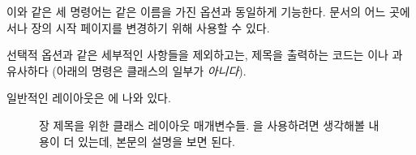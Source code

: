 이와 같은 세 명령어는 같은 이름을 가진 옵션과 동일하게 기능한다.
문서의 어느 곳에서나 장의 시작 페이지를 변경하기 위해 사용할 수 있다.

선택적 옵션과 같은 세부적인 사항들을 제외하고는,
\cmd{\chapter} 제목을 출력하는 코드는 \cmd{\book} 이나 \cmd{\part} 과 유사하다
(아래의  명령은 클래스의 일부가 \emph{아니다}).
\begin{lcode}
\newcommand{\chapterhead}[1]{ %
  \clearforchapter        %
  \thispagestyle{chapter} %
  \insertchapterspace     %
  \chapterheadstart       %
  \printchaptername\chapternamenum\printchapternum
  \afterchapternum        %
  \printchaptertitle{#1}  %
  \afterchaptertitle}     %
\end{lcode}
일반적인 레이아웃은 에 나와 있다.

\begin{figure}
\centering
\chapterdiagram
\caption{
	장 제목을 위한 클래스 레이아웃 매개변수들.
	을 사용하려면 생각해볼 내용이 더 있는데, 본문의 설명을 보면 된다.
} 
\label{lay:chap}
\end{figure}

